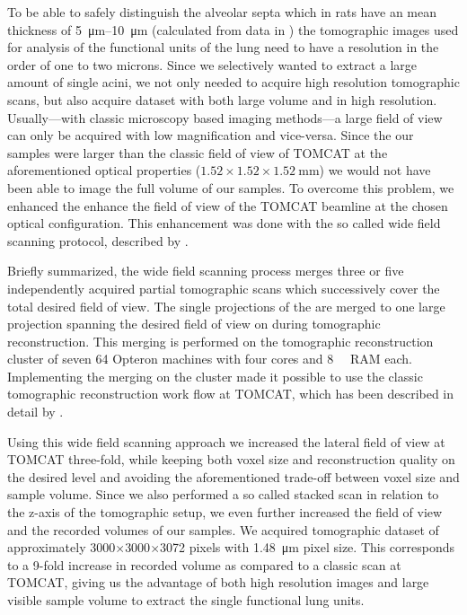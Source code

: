 \documentclass[%
	paper=a4,%
	abstract=true,%
	]{scrartcl}
\begin{document}
To be able to safely distinguish the alveolar septa which in rats have an mean thickness of \SIrange{5}{10}{\micro\meter} (calculated from data in \citet{Burri1974}) the tomographic images used for analysis of the functional units of the lung need to have a resolution in the order of one to two microns. Since we selectively wanted to extract a large amount of single acini, we not only needed to acquire high resolution tomographic scans, but also acquire dataset with both large volume and in high resolution. Usually---with classic microscopy based imaging methods---a large field of view can only be acquired with low magnification and vice-versa. Since the our samples were larger than the classic field of view of TOMCAT at the aforementioned optical properties (\(1.52\times1.52\times\SI{1.52}{\milli\meter}\)) we would not have been able to image the full volume of our samples. To overcome this problem, we enhanced the enhance the field of view of the TOMCAT beamline at the chosen optical configuration. This enhancement was done with the so called wide field scanning protocol, described by \citet{Haberthuer2010}.

Briefly summarized, the wide field scanning process merges three or five independently acquired partial tomographic scans which successively cover the total desired field of view. The single projections of the are merged to one large projection spanning the desired field of view on during tomographic reconstruction. This merging is performed on the tomographic reconstruction cluster of seven \SI{64}{\bit} Opteron machines with four cores and \SI{8}{\giga\byte} RAM each. Implementing the merging on the cluster made it possible to use the classic tomographic reconstruction work flow at TOMCAT, which has been described in detail by \citet{Hintermueller2010}.

Using this wide field scanning approach we increased the lateral field of view at TOMCAT three-fold, while keeping both voxel size and reconstruction quality on the desired level and avoiding the aforementioned trade-off between voxel size and sample volume. Since we also performed a so called stacked scan in relation to the z-axis of the tomographic setup, we even further increased the field of view and the recorded volumes of our samples. We acquired tomographic dataset of approximately 3000\(\times\)3000\(\times\)3072 pixels with \SI{1.48}{\micro\meter} pixel size. This corresponds to a 9-fold increase in recorded volume as compared to a classic scan at TOMCAT, giving us the advantage of both high resolution images and large visible sample volume to extract the single functional lung units.
\end{document}
